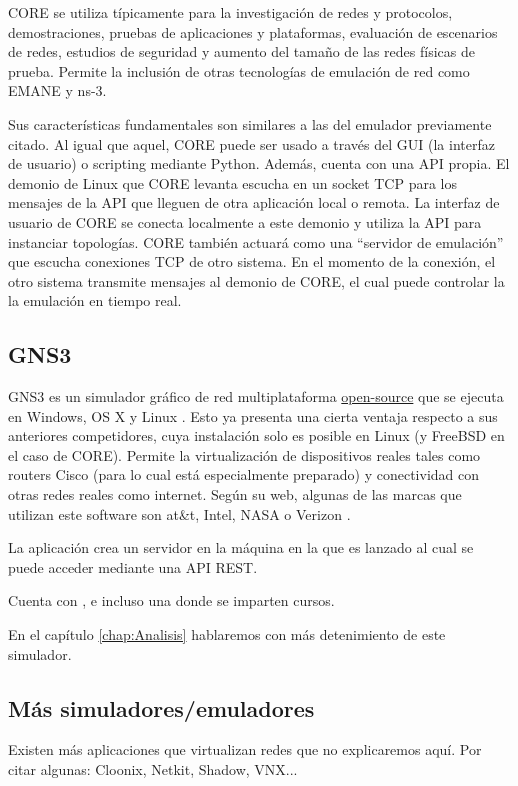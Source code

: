 CORE se utiliza típicamente para la investigación de redes y protocolos, demostraciones, pruebas de aplicaciones y plataformas, evaluación de escenarios de redes, estudios de seguridad y aumento del tamaño de las redes físicas de prueba. Permite la inclusión de otras tecnologías de emulación de red como EMANE y ns-3\cite{core}.

Sus características fundamentales son similares a las del emulador previamente citado. Al igual que aquel, CORE puede ser usado a través del GUI (la interfaz de usuario) o scripting mediante Python. Además, cuenta con una API propia. El demonio de Linux que CORE levanta escucha en un socket TCP para los mensajes de la API que lleguen de otra aplicación local o remota. La interfaz de usuario de CORE se conecta localmente a este demonio y utiliza la API para instanciar topologías. CORE también actuará como una ``servidor de emulación'' que escucha conexiones TCP de otro sistema. En el momento de la conexión, el otro sistema transmite mensajes al demonio de CORE, el cual puede controlar la la emulación en tiempo real\cite{coreapi}.

\subsection{GNS3}
GNS3 es un simulador gráfico de red multiplataforma \href{https://github.com/GNS3}{open-source} que se ejecuta en Windows, OS X y Linux \cite{bookgns}. Esto ya presenta una cierta ventaja respecto a sus anteriores competidores, cuya instalación solo es posible en Linux (y FreeBSD en el caso de CORE). Permite la virtualización de dispositivos reales tales como routers Cisco (para lo cual está especialmente preparado) y conectividad con otras redes reales como internet. Según su web, algunas de las marcas que utilizan este software son at\&t, Intel, NASA o Verizon \cite{gnsweb}.

La aplicación crea un servidor en la máquina en la que es lanzado al cual se puede acceder mediante una API REST. 

Cuenta con ,  e incluso una  donde se imparten cursos.  

En el capítulo \ref{chap:Analisis} hablaremos con más detenimiento de este simulador.

\subsection{Más simuladores/emuladores}
Existen más aplicaciones que virtualizan redes que no explicaremos aquí. Por citar algunas: Cloonix, Netkit, Shadow, VNX...


